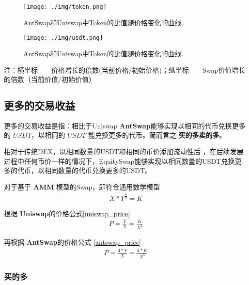 \documentclass{article}
\begin{document}
\begin{figure}[H]
\centering
\texttt{[image: ./img/token.png]}
\caption{\label{fig}AntSwap和Uniswap中Token的比值随价格变化的曲线.}
\end{figure}

\begin{figure}[H]
\centering
\texttt{[image: ./img/usdt.png]}
\caption{\label{fig}AntSwap和Uniswap中Token的比值随价格变化的曲线.}
\end{figure}

注：横坐标——价格增长的倍数(当前价格/初始价格)；纵坐标——Swap价值增长的倍数（当前价值/初始价值） 

\subsection{更多的交易收益}

更多的交易收益是指：相比于Uniswap \textbf{AntSwap}能够实现以相同的代币兑换更多的 $USDT$，以相同的 $USDT$ 能兑换更多的代币。简而言之 \textbf{买的多卖的多}。

相对于传统DEX，以相同数量的USDT和相同的币价添加流动性后 ，在后续发展过程中任何币价一样的情况下，EquitySwap能够实现以相同数量的USDT兑换更多的代币，以相同数量的代币兑换更多的USDT。

对于基于 \textbf{AMM} 模型的Swap，即符合通用数学模型
\begin{equation} \label{common_amm}
\begin{split}
X * Y^\frac{b}{a} = K
\end{split}
\end{equation}


根据 \textbf{Uniswap}的价格公式\ref{uniswap_price}
\begin{equation*}
\begin{split}
P = \frac{Y}{X} = \frac{K}{X^2}
\end{split}
\end{equation*}

再根据 \textbf{AntSwap}的价格公式 \ref{antswap_price}
\begin{equation*}
\begin{split}
P = \frac{4 * Y}{X} = \frac{4 * K}{X^5}
\end{split}
\end{equation*}

\subsubsection{买的多}
\end{document}
